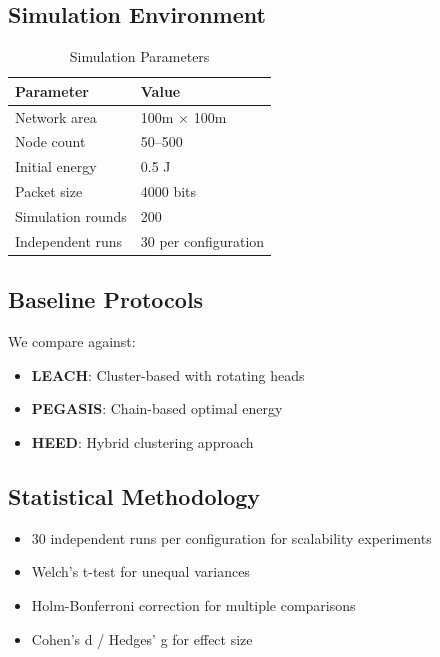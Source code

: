 \documentclass[twocolumn]{article}
\begin{document}
\subsection{Simulation Environment}

\begin{table}[htbp]
\centering
\caption{Simulation Parameters}
\label{tab:sim_params}
\begin{tabular}{@{}ll@{}}
\toprule
Parameter & Value \\
\midrule
Network area & 100m $\times$ 100m \\
Node count & 50--500 \\
Initial energy & 0.5 J \\
Packet size & 4000 bits \\
Simulation rounds & 200 \\
Independent runs & 30 per configuration \\
\bottomrule
\end{tabular}
\end{table}

\subsection{Baseline Protocols}

We compare against:
\begin{itemize}
    \item \textbf{LEACH}: Cluster-based with rotating heads
    \item \textbf{PEGASIS}: Chain-based optimal energy
    \item \textbf{HEED}: Hybrid clustering approach
\end{itemize}

\subsection{Statistical Methodology}

\begin{itemize}
    \item 30 independent runs per configuration for scalability experiments
    \item Welch's t-test for unequal variances
    \item Holm-Bonferroni correction for multiple comparisons
    \item Cohen's d / Hedges' g for effect size
\end{itemize}

\end{document}
